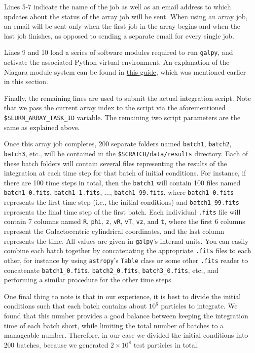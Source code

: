 \documentclass[10pt]{article}
\begin{document}
Lines 5-7 indicate the name of the job as well as an email address to which updates about the status of the array job will be sent. When using an array job, an email will be sent only when the first job in the array begins and when the last job finishes, as opposed to sending a separate email for every single job.

Lines 9 and 10 load a series of software modules required to run \texttt{galpy}, and activate the associated Python virtual environment. An explanation of the Niagara module system can be found in \href{https://github.com/mwbub/scinet-setup}{this guide}, which was mentioned earlier in this section.

Finally, the remaining lines are used to submit the actual integration script. Note that we pass the current array index to the script via the aforementioned \texttt{\$SLURM\_ARRAY\_TASK\_ID} variable. The remaining two script parameters are the same as explained above.

Once this array job completes, 200 separate folders named \texttt{batch1}, \texttt{batch2}, \texttt{batch3}, etc., will be contained in the \texttt{\$SCRATCH/data/results} directory. Each of these batch folders will contain several files representing the results of the integration at each time step for that batch of initial conditions. For instance, if there are 100 time steps in total, then the \texttt{batch1} will contain 100 files named \texttt{batch1\_0.fits}, \texttt{batch1\_1.fits}, $\ldots$, \texttt{batch1\_99.fits}, where \texttt{batch1\_0.fits} represents the first time step (i.e., the initial conditions) and \texttt{batch1\_99.fits} represents the final time step of the first batch. Each individual \texttt{.fits} file will contain 7 columns named \texttt{R}, \texttt{phi}, \texttt{z}, \texttt{vR}, \texttt{vT}, \texttt{vz}, and \texttt{t}, where the first 6 columns represent the Galactocentric cylindrical coordinates, and the last column represents the time. All values are given in \texttt{galpy}'s internal units. You can easily combine each batch together by concatenating the appropriate \texttt{.fits} files to each other, for instance by using \texttt{astropy}'s \texttt{Table} class or some other \texttt{.fits} reader to concatenate \texttt{batch1\_0.fits}, \texttt{batch2\_0.fits}, \texttt{batch3\_0.fits}, etc., and performing a similar procedure for the other time steps.

One final thing to note is that in our experience, it is best to divide the initial conditions such that each batch contains about $10^6$ particles to integrate. We found that this number provides a good balance between keeping the integration time of each batch short, while limiting the total number of batches to a manageable number. Therefore, in our case we divided the initial conditions into 200 batches, because we generated $2 \times 10^8$ test particles in total.
\end{document}
